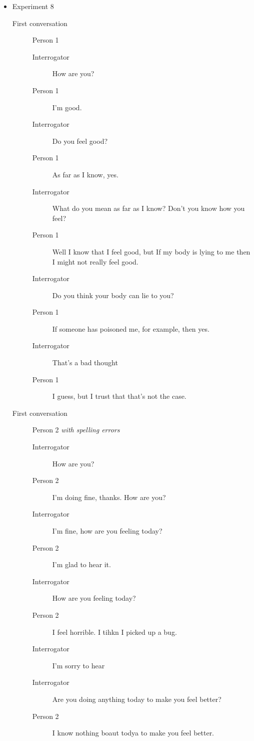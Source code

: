 \begin{itemize}
   \item Experiment 8
      \begin{description}
         \item [First conversation] Person 1
            \begin{description}
               \item [Interrogator] How are you?
               \item [Person 1] I'm good.
               \item [Interrogator] Do you feel good?
               \item [Person 1] As far as I know, yes.
               \item [Interrogator] What do you mean as far as I know? Don't you know how you feel?
               \item [Person 1] Well I know that I feel good, but If my body is lying to me then I might not really feel good.
               \item [Interrogator] Do you think your body can lie to you?
               \item [Person 1] If someone has poisoned me, for example, then yes.
               \item [Interrogator] That's a bad thought
               \item [Person 1] I guess, but I trust that that's not the case.
            \end{description}
         \item [First conversation] Person 2 \textit{with spelling errors}
            \begin{description}
               \item [Interrogator] How are you?
               \item [Person 2] I'm doing fine, thanks. How are you?
               \item [Interrogator] I'm fine, how are you feeling today?
               \item [Person 2] I'm glad to hear it.
               \item [Interrogator] How are you feeling today?
               \item [Person 2] I feel horrible. I tihkn I picked up a bug.
               \item [Interrogator] I'm sorry to hear
               \item [Interrogator] Are you doing anything today to make you feel better?
               \item [Person 2] I know nothing boaut todya to make you feel better.

\end{description}
\end{description}
\end{itemize}
